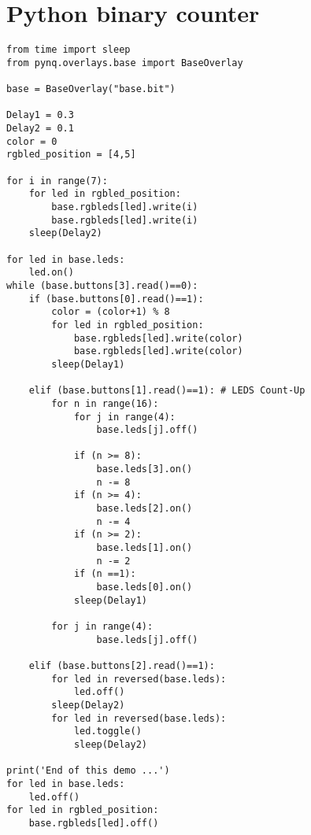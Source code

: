 \section{Python binary counter}
\lstset{language=Python}
\begin{lstlisting}
from time import sleep
from pynq.overlays.base import BaseOverlay

base = BaseOverlay("base.bit")

Delay1 = 0.3
Delay2 = 0.1
color = 0
rgbled_position = [4,5]

for i in range(7):
    for led in rgbled_position:
        base.rgbleds[led].write(i)
        base.rgbleds[led].write(i)
    sleep(Delay2)

for led in base.leds:
    led.on()    
while (base.buttons[3].read()==0):
    if (base.buttons[0].read()==1):
        color = (color+1) % 8
        for led in rgbled_position:
            base.rgbleds[led].write(color)
            base.rgbleds[led].write(color)
        sleep(Delay1)
        
    elif (base.buttons[1].read()==1): # LEDS Count-Up
        for n in range(16):
            for j in range(4):
                base.leds[j].off()
                
            if (n >= 8):
                base.leds[3].on()
                n -= 8
            if (n >= 4):
                base.leds[2].on()
                n -= 4
            if (n >= 2):
                base.leds[1].on()
                n -= 2
            if (n ==1):
                base.leds[0].on()
            sleep(Delay1)
            
        for j in range(4):
                base.leds[j].off()
            
    elif (base.buttons[2].read()==1):
        for led in reversed(base.leds):
            led.off()
        sleep(Delay2)
        for led in reversed(base.leds):
            led.toggle()
            sleep(Delay2)                  
    
print('End of this demo ...')
for led in base.leds:
    led.off()
for led in rgbled_position:
    base.rgbleds[led].off()
\end{lstlisting}


